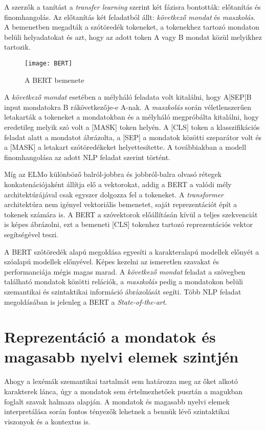 A szerzők a tanítást a \textit{transfer learning} szerint két fázisra bontották: előtanítás és finomhangolás. Az előtanítás két feladatból állt: \textit{következő mondat} és \textit{maszkolás}.
A bemenetben megadták a szótöredék tokeneket, a tokenekhez tartozó mondaton belüli helyadatokat és azt, hogy az adott token A vagy B mondat közül melyikhez tartozik.

\begin{figure}[H]
	\centering
	\texttt{[image: BERT]}
	\caption{A BERT bemenete}
\end{figure}

A \textit{következő mondat} esetében a mélyháló feladata volt kitalálni, hogy A[SEP]B input mondatokra B rákövetkezője-e A-nak. A \textit{maszkolás} során véletlenszerűen letakarták a tokeneket a mondatokban és a mélyháló megpróbálta kitalálni, hogy eredetileg melyik szó volt a [MASK] token helyén.  A [CLS] token a klasszifikációs feladat alatt a mondatot ábrázolta, a [SEP] a mondatok közötti szeparátor volt és a [MASK] a letakart szótöredékeket helyettesítette. A továbbiakban a modell finomhangolása az adott NLP feladat szerint történt.

Míg az ELMo különböző balról-jobbra és jobbról-balra olvasó rétegek konkatenációjaként állítja elő a vektorokat, addig a BERT a valódi mély architektúrájával csak egyszer dolgozza fel a tokeneket. A \textit{transformer} architektúra nem igényel vektoriális bemenetet, saját reprezentációt épít a tokenek számára is. A BERT a szóvektorok előállításán kívül a teljes szekvenciát is képes ábrázolni, ezt a bemeneti [CLS] tokenhez tartozó reprezentációs vektor segítségével teszi.

A BERT szótöredék alapú megoldása egyesíti a karakteralapú modellek előnyét a szóalapú modellek előnyével. Képes kezelni az ismeretlen szavakat és performanciája mégis magas marad. A \textit{következő mondat} feladat a szövegben található mondatok közötti relációk, a \textit{maszkolás} pedig a mondatokon belüli szemantikai és szintaktikai információ ábrázolását segíti. Több NLP feladat megoldásában is jelenleg a BERT a \textit{State-of-the-art}.

\section{Reprezentáció a mondatok és magasabb nyelvi elemek szintjén}

Ahogy a lexémák szemantikai tartalmát sem határozza meg az őket alkotó karakterek lánca, úgy a mondatok sem értelmezhetőek pusztán a magukban foglalt szavak halmaza alapján. A mondatok és magasabb nyelvi elemek interpretálása során fontos tényezők lehetnek a bennük lévő szintaktikai viszonyok és a kontextus is.

